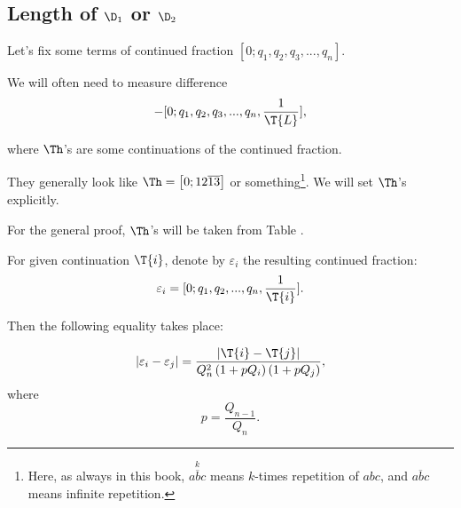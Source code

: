 \subsection{Length of $\D_1$ or $\D_2$}

Let's fix some terms of continued fraction $[0; q_1, q_2, q_3, ..., q_n]$.

We will often need to measure difference
\begin{equation*}
	[0; q_1, q_2, q_3, ..., q_n, \frac{1}{\T{R}}] - 
	[0; q_1, q_2, q_3, ..., q_n, \frac{1}{\T{L}}],
\end{equation*}

where $\Th$'s are some continuations of the continued fraction.

They generally look like $\Th = \left[ 0;12\overline{13} \right]$ or something\footnote{%
	Here, as always in this book, $\overset{k}{\overline{abc}}$
	means $k$-times repetition of $abc$,
	and $\overline{abc}$ means infinite repetition.}.
We will set $\Th$'s explicitly.

For the general proof, $\Th$'s will be taken from Table .

\begin{designation}
	For given continuation $\T{i}$, denote by $\varepsilon_i$ the resulting continued fraction:
	\begin{equation}\label{eq:epsilon-rule}
		\varepsilon_i = [0; q_1, q_2, ..., q_n, \frac{1}{\T{i}}].
	\end{equation}
\end{designation}

Then the following equality takes place:

\begin{equation}\label{varepsilons_difference}
	| \varepsilon_i - \varepsilon_j | = 
	\dfrac{| \T{i} - \T{j} |}
	{Q_n^2 \left(1 + pQ_i\right) \left(1 + pQ_j\right)},
\end{equation}
%
where
%
\begin{equation*}
	p = \dfrac{Q_{n-1}}{Q_n}.
\end{equation*}
